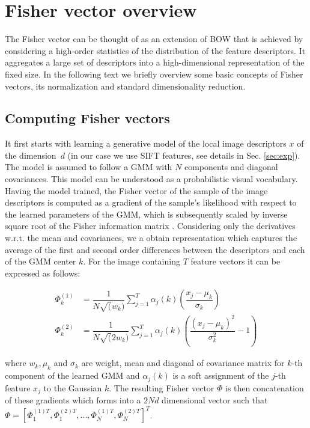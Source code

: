 \documentclass[table]{article} %
\begin{document}
\section{Fisher vector overview}
\label{sec:FV}
	The Fisher vector can be thought of as an extension of BOW \cite{Sivic2003} that is achieved by considering a high-order statistics of the distribution of the feature descriptors. It aggregates a large set of descriptors into a high-dimensional representation of the fixed size. In the following text we briefly overview some basic concepts of Fisher vectors, its normalization and standard dimensionality reduction.

	\subsection{Computing Fisher vectors}
		It first starts with learning a generative model of the local image descriptors $x$ of the dimension~$d$ (in our case we use SIFT features, see details in Sec. \ref{sec:exp}). The model is assumed to follow a GMM with $N$ components and diagonal covariances. This model can be understood as a probabilistic visual vocabulary. Having the model trained, the Fisher vector of the sample of the image descriptors is computed as a gradient of the sample's likelihood with respect to the learned parameters of the GMM, which is subsequently scaled by inverse square root of the Fisher information matrix \cite{Perronnin2007}. Considering only the derivatives w.r.t. the mean and covariances, we a obtain representation which captures the average of the first and second order differences between the descriptors and each of the GMM center $k$. For the image containing $T$ feature vectors it can be expressed as follows:
		
		\begin{align}
			\Phi^{(1)}_k&=
			\dfrac{1}{N \sqrt(w_k)}\sum_{j=1}^{T} \alpha_j(k) \left(
			\dfrac{x_j-\mu_k}{\sigma_k}
			\right)
			\label{eq:FVmean}
			\\
			\Phi^{(2)}_k&=
			\dfrac{1}{N \sqrt(2w_k)}\sum_{j=1}^{T} \alpha_j(k) \left(
			\dfrac{(x_j-\mu_k)^2}{\sigma_k^2}-1 
			\right)
			\label{eq:FVvar}
		\end{align}

		\noindent
		where $w_k, \mu_k$ and $\sigma_k$ are weight, mean and diagonal of covariance matrix for $k$-th component of the learned GMM and $\alpha_j(k)$ is a soft assignment of the $j$-th feature $x_j$ to the Gaussian $k$. The resulting Fisher vector  $\Phi$ is then concatenation of these gradients which forms into a $2Nd$ dimensional vector such that $\Phi=[\Phi^{(1)T}_1,\Phi^{(2)T}_1,...,\Phi^{(1)T}_N,\Phi^{(2)T}_N]^T$.
\end{document}

